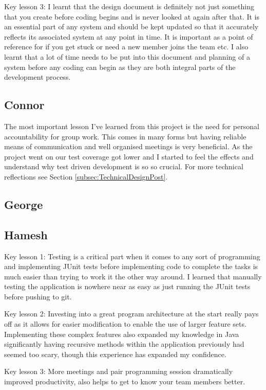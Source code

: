 Key lesson 3:
I learnt that the design document is definitely not just something that you create before coding begins and is never looked at again after that. It is an essential part of any system and should be kept updated so that it accurately reflects its associated system  at any point in time. It is important as a point of reference for if you get stuck or need a new member joins the team etc. I also learnt that a lot of time needs to be put into this document and planning of a system before any coding can begin as they are both integral parts of the development process.


\subsection{Connor}
The most important lesson I've learned from this project is the need for personal accountability for group work. This comes in many forms but having reliable means of communication and well organised meetings is very beneficial. As the project went on our test coverage got lower and I started to feel the effects and understand why test driven development is so so crucial. For more technical reflections see Section \ref{subsec:TechnicalDesignPost}.

\subsection{George}

\subsection{Hamesh}
Key lesson 1:
Testing is a critical part when it comes to any sort of programming and implementing JUnit tests before implementing code to complete the tasks is much easier than trying to work it the other way around. I learned that manually testing the application is nowhere near as easy as just running the JUnit tests before pushing to git.

Key lesson 2:
Investing into a great program architecture at the start really pays off as it allows for easier modification to enable the use of larger feature sets. Implementing these complex features also expanded my knowledge in Java significantly having recursive methods within the application previously had seemed too scary, though this experience has expanded my confidence.

Key lesson 3:
More meetings and pair programming session dramatically improved productivity, also helps to get to know your team members better.

